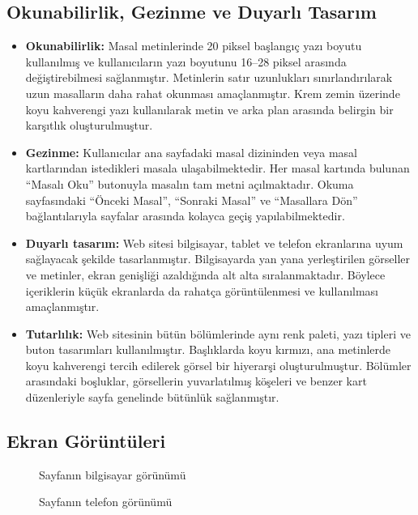 \documentclass[12pt,a4paper]{article}
\begin{document}
\subsection{Okunabilirlik, Gezinme ve Duyarlı Tasarım}
\begin{itemize}
  \item \textbf{Okunabilirlik:}  Masal metinlerinde 20 piksel başlangıç yazı boyutu kullanılmış ve kullanıcıların yazı boyutunu 16–28 piksel arasında değiştirebilmesi sağlanmıştır. Metinlerin satır uzunlukları sınırlandırılarak uzun masalların daha rahat okunması amaçlanmıştır. Krem zemin üzerinde koyu kahverengi yazı kullanılarak metin ve arka plan arasında belirgin bir karşıtlık oluşturulmuştur.
  \item \textbf{Gezinme:} Kullanıcılar ana sayfadaki masal dizininden veya masal kartlarından istedikleri masala ulaşabilmektedir. Her masal kartında bulunan “Masalı Oku” butonuyla masalın tam metni açılmaktadır. Okuma sayfasındaki “Önceki Masal”, “Sonraki Masal” ve “Masallara Dön” bağlantılarıyla sayfalar arasında kolayca geçiş yapılabilmektedir.
  \item \textbf{Duyarlı tasarım:} Web sitesi bilgisayar, tablet ve telefon ekranlarına uyum sağlayacak şekilde tasarlanmıştır. Bilgisayarda yan yana yerleştirilen görseller ve metinler, ekran genişliği azaldığında alt alta sıralanmaktadır. Böylece içeriklerin küçük ekranlarda da rahatça görüntülenmesi ve kullanılması amaçlanmıştır.
  \item \textbf{Tutarlılık:} Web sitesinin bütün bölümlerinde aynı renk paleti, yazı tipleri ve buton tasarımları kullanılmıştır. Başlıklarda koyu kırmızı, ana metinlerde koyu kahverengi tercih edilerek görsel bir hiyerarşi oluşturulmuştur. Bölümler arasındaki boşluklar, görsellerin yuvarlatılmış köşeleri ve benzer kart düzenleriyle sayfa genelinde bütünlük sağlanmıştır.
\end{itemize}

\subsection{Ekran Görüntüleri}
 \begin{figure}[h]
   \centering
   \caption{Sayfanın bilgisayar görünümü}
 \end{figure}
 \begin{figure}[h]
   \centering
   \caption{Sayfanın telefon görünümü}
  \end{figure}
\end{document}

